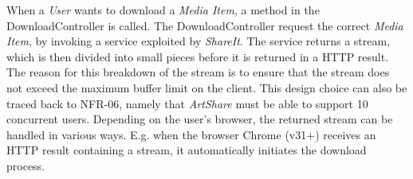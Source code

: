 \documentclass[../report.tex]{subfiles}
\begin{document}
When a \textit{User} wants to download a \textit{Media Item}, a method in the DownloadController is called. The DownloadController request the correct \textit{Media Item}, by invoking a service exploited by \textit{ShareIt}. The service returns a stream, which is then divided into small pieces before it is returned in a HTTP result. The reason for this breakdown of the stream is to ensure that the stream does not exceed the maximum buffer limit on the client. This design choice can also be traced back to NFR-06, namely that \textit{ArtShare} must be able to support 10 concurrent users. Depending on the user's browser, the returned stream can be handled in various ways. E.g. when the browser Chrome (v31+) receives an HTTP result containing a stream, it automatically initiates the download process.
\end{document}
